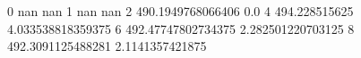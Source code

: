 0 nan nan
1 nan nan
2 490.1949768066406 0.0
4 494.228515625 4.033538818359375
6 492.47747802734375 2.282501220703125
8 492.3091125488281 2.1141357421875
